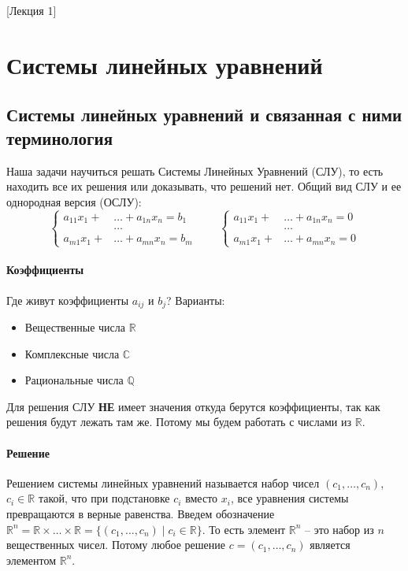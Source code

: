 [Лекция 1]

\newpage

\section{Системы линейных уравнений}


\subsection{Системы линейных уравнений и связанная с ними терминология}

Наша задачи научиться решать Системы Линейных Уравнений (СЛУ), то есть находить все их решения или доказывать, что решений нет.
Общий вид СЛУ и ее однородная версия (ОСЛУ):
\[
\left\{
\begin{aligned}
a_{11}x_1 + &\ldots + a_{1n}x_n = b_1\\
&\ldots \\
a_{m1}x_1 + &\ldots + a_{mn}x_n = b_m
\end{aligned}
\right.\quad\quad
\left\{
\begin{aligned}
a_{11}x_1 + &\ldots + a_{1n}x_n = 0\\
&\ldots \\
a_{m1}x_1 + &\ldots + a_{mn}x_n = 0
\end{aligned}
\right.
\]
\paragraph{Коэффициенты}
Где живут коэффициенты $a_{ij}$ и $b_j$? Варианты:
\begin{itemize}
\item Вещественные числа $\mathbb R$
\item Комплексные числа $\mathbb C$
\item Рациональные числа $\mathbb Q$
\end{itemize}
Для решения СЛУ {\bf НЕ} имеет значения откуда берутся коэффициенты, так как решения будут лежать там же.
Потому мы будем работать с числами из $\mathbb R$.

\paragraph{Решение}
Решением системы линейных уравнений называется набор чисел $(c_1,\ldots,c_n)$, $c_i\in\mathbb R$ такой, что при подстановке $c_i$ вместо $x_i$, все уравнения системы превращаются в верные равенства.
Введем обозначение $\mathbb R^n = \mathbb R\times \ldots \times \mathbb R = \{(c_1,\ldots,c_n)\mid c_i\in \mathbb R\}$.
То есть элемент $\mathbb R^n$ -- это набор из $n$ вещественных чисел.
Потому любое решение $c=(c_1,\ldots,c_n)$ является элементом $\mathbb R^n$.

